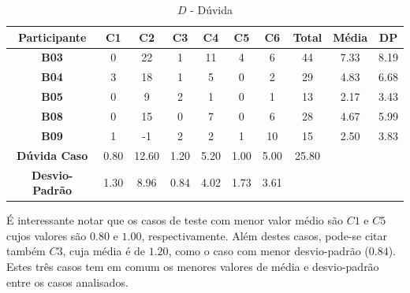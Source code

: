 \begin{table}[htbp]
	\centering
	\caption{$D$ - Dúvida}
	\begin{tabular}{|c|c|c|c|c|c|c|ccc}
		\hline
		\rowcolor[HTML]{D9D9D9} 
		\cellcolor[HTML]{D0CECE}\textbf{Participante} & \textbf{C1} & \textbf{C2} & \textbf{C3} & \textbf{C4} & \textbf{C5} & \textbf{C6} & \multicolumn{1}{c|}{\cellcolor[HTML]{D0CECE}\textbf{Total}} & \multicolumn{1}{c|}{\cellcolor[HTML]{D9D9D9}\textbf{Média}} & \multicolumn{1}{c|}{\cellcolor[HTML]{D9D9D9}\textbf{DP}} \\ \hline
		\cellcolor[HTML]{F2F2F2}\textbf{B03} & 0 & 22 & 1 & 11 & 4 & 6 & \multicolumn{1}{c|}{44} & \multicolumn{1}{c|}{7.33} & \multicolumn{1}{c|}{8.19} \\ \hline
		\rowcolor[HTML]{D9D9D9} 
		\textbf{B04} & 3 & 18 & 1 & 5 & 0 & 2 & \multicolumn{1}{c|}{\cellcolor[HTML]{D9D9D9}29} & \multicolumn{1}{c|}{\cellcolor[HTML]{D9D9D9}4.83} & \multicolumn{1}{c|}{\cellcolor[HTML]{D9D9D9}6.68} \\ \hline
		\cellcolor[HTML]{F2F2F2}\textbf{B05} & 0 & 9 & 2 & 1 & 0 & 1 & \multicolumn{1}{c|}{13} & \multicolumn{1}{c|}{2.17} & \multicolumn{1}{c|}{3.43} \\ \hline
		\rowcolor[HTML]{D9D9D9} 
		\textbf{B08} & 0 & 15 & 0 & 7 & 0 & 6 & \multicolumn{1}{c|}{\cellcolor[HTML]{D9D9D9}28} & \multicolumn{1}{c|}{\cellcolor[HTML]{D9D9D9}4.67} & \multicolumn{1}{c|}{\cellcolor[HTML]{D9D9D9}5.99} \\ \hline
		\cellcolor[HTML]{F2F2F2}\textbf{B09} & 1 & -1 & 2 & 2 & 1 & 10 & \multicolumn{1}{c|}{15} & \multicolumn{1}{c|}{2.50} & \multicolumn{1}{c|}{3.83} \\ \hline
		\cellcolor[HTML]{D9D9D9}\textbf{Dúvida Caso} & \cellcolor[HTML]{D9D9D9}0.80 & \cellcolor[HTML]{D9D9D9}12.60 & \cellcolor[HTML]{D9D9D9}1.20 & \cellcolor[HTML]{D9D9D9}5.20 & \cellcolor[HTML]{D9D9D9}1.00 & \cellcolor[HTML]{D9D9D9}5.00 & \multicolumn{1}{c|}{\cellcolor[HTML]{D9D9D9}25.80} & \multicolumn{1}{l}{} & \multicolumn{1}{l}{} \\ \cline{1-8}
		\textbf{Desvio-Padrão} & 1.30 & 8.96 & 0.84 & 4.02 & 1.73 & 3.61 & \multicolumn{1}{l}{} & \multicolumn{1}{l}{} & \multicolumn{1}{l}{} \\ \cline{1-7}
	\end{tabular}
	\label{tab:F3_A4_D}
\end{table}

É interessante notar que os casos de teste com menor valor médio são $C1$ e $C5$ cujos valores são $0.80$ e $1.00$, respectivamente. Além destes casos, pode-se citar também $C3$, cuja média é de $1.20$, como o caso com menor desvio-padrão ($0.84$). Estes três casos tem em comum os menores valores de média e desvio-padrão entre os casos analisados.

